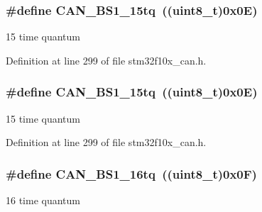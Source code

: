 \subsubsection[{\texorpdfstring{C\+A\+N\+\_\+\+B\+S1\+\_\+15tq}{CAN_BS1_15tq}}]{\setlength{\rightskip}{0pt plus 5cm}\#define C\+A\+N\+\_\+\+B\+S1\+\_\+15tq~(({\bf uint8\+\_\+t})0x0\+E)}\hypertarget{group___c_a_n__time__quantum__in__bit__segment__1_gaa52c8674dc7caae1089e5276cd13db5f}{}\label{group___c_a_n__time__quantum__in__bit__segment__1_gaa52c8674dc7caae1089e5276cd13db5f}
15 time quantum 

Definition at line 299 of file stm32f10x\+\_\+can.\+h.

\subsubsection[{\texorpdfstring{C\+A\+N\+\_\+\+B\+S1\+\_\+15tq}{CAN_BS1_15tq}}]{\setlength{\rightskip}{0pt plus 5cm}\#define C\+A\+N\+\_\+\+B\+S1\+\_\+15tq~(({\bf uint8\+\_\+t})0x0\+E)}\hypertarget{group___c_a_n__time__quantum__in__bit__segment__1_gaa52c8674dc7caae1089e5276cd13db5f}{}\label{group___c_a_n__time__quantum__in__bit__segment__1_gaa52c8674dc7caae1089e5276cd13db5f}
15 time quantum 

Definition at line 299 of file stm32f10x\+\_\+can.\+h.

\subsubsection[{\texorpdfstring{C\+A\+N\+\_\+\+B\+S1\+\_\+16tq}{CAN_BS1_16tq}}]{\setlength{\rightskip}{0pt plus 5cm}\#define C\+A\+N\+\_\+\+B\+S1\+\_\+16tq~(({\bf uint8\+\_\+t})0x0\+F)}\hypertarget{group___c_a_n__time__quantum__in__bit__segment__1_ga3be52c699f5618cc318c143ee42f5966}{}\label{group___c_a_n__time__quantum__in__bit__segment__1_ga3be52c699f5618cc318c143ee42f5966}
16 time quantum 

